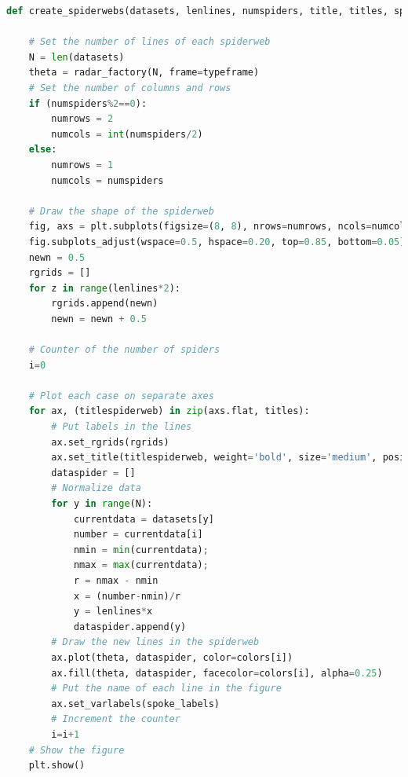 \begin{lstlisting}[language=Python, caption=Generación de graficos de radar, basicstyle=\tiny, label=lst:c3]
def create_spiderwebs(datasets, lenlines, numspiders, title, titles, spoke_labels, colors, typeframe):

    # Set the number of lines of each spiderweb
    N = len(datasets)
    theta = radar_factory(N, frame=typeframe)
    # Set the number of columns and rows
    if (numspiders%2==0):
        numrows = 2
        numcols = int(numspiders/2)
    else:
        numrows = 1
        numcols = numspiders
        
    # Draw the shape of the spiderweb
    fig, axs = plt.subplots(figsize=(8, 8), nrows=numrows, ncols=numcols, subplot_kw=dict(projection='radar'))
    fig.subplots_adjust(wspace=0.5, hspace=0.20, top=0.85, bottom=0.05)
    newn = 0.5
    rgrids = []
    for z in range(lenlines*2):
        rgrids.append(newn)
        newn = newn + 0.5

    # Counter of the number of spiders
    i=0

    # Plot each case on separate axes
    for ax, (titlespiderweb) in zip(axs.flat, titles):
        # Put labels in the lines
        ax.set_rgrids(rgrids)        
        ax.set_title(titlespiderweb, weight='bold', size='medium', position=(0.5, 1.1))
        dataspider = []
        # Normalize data
        for y in range(N):
            currentdata = datasets[y]
            number = currentdata[i]
            nmin = min(currentdata);
            nmax = max(currentdata);
            r = nmax - nmin
            x = (number-nmin)/r
            y = lenlines*x
            dataspider.append(y)
        # Draw the new lines in the spiderweb
        ax.plot(theta, dataspider, color=colors[i])
        ax.fill(theta, dataspider, facecolor=colors[i], alpha=0.25)
        # Put the name of each line in the figure
        ax.set_varlabels(spoke_labels)
        # Increment the counter
        i=i+1
    # Show the figure
    plt.show()
\end{lstlisting}

